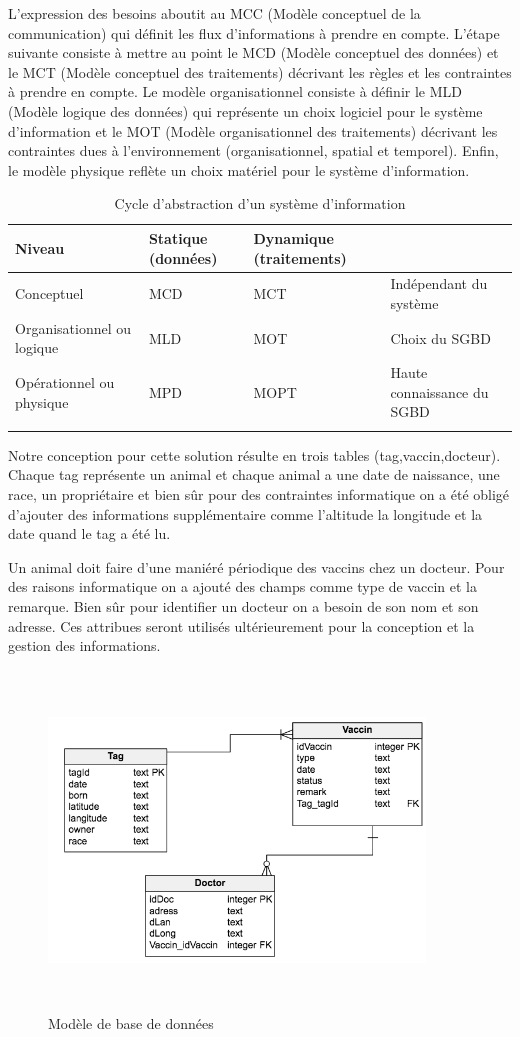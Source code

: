 \documentclass[11pt, a4paper, twoside]{book}
\begin{document}
L'expression des besoins aboutit au MCC (Modèle conceptuel de la communication) qui définit les flux d'informations à prendre en compte.
L'étape suivante consiste à mettre au point le MCD (Modèle conceptuel des données) et le MCT (Modèle conceptuel des traitements) décrivant les règles et les contraintes à prendre en compte.
Le modèle organisationnel consiste à définir le MLD (Modèle logique des données) qui représente un choix logiciel pour le système d'information et le MOT (Modèle organisationnel des traitements) décrivant les contraintes dues à l'environnement (organisationnel, spatial et temporel).
Enfin, le modèle physique reflète un choix matériel pour le système d'information. 


\begin{longtable}{|p{}|p{}|p{}| p{}|}
\hline
\textbf{Niveau } & \textbf{Statique (données) } & \textbf{Dynamique (traitements) } & \\
\hline
Conceptuel  & MCD & MCT  & Indépendant du système \\
\hline
Organisationnel ou logique  & MLD & MOT & Choix du SGBD
 \\
\hline
Opérationnel
ou physique  & MPD  & MOPT  & Haute connaissance du
SGBD \\
\hline
\caption{Cycle d'abstraction d'un système d'information}
\end{longtable}

Notre conception pour cette solution résulte en trois tables (tag,vaccin,docteur). Chaque tag représente un animal et chaque animal a une date de naissance, une race, un propriétaire et bien sûr pour des contraintes informatique on a été obligé d'ajouter des informations supplémentaire comme l'altitude la longitude et la date quand le tag a été lu.

Un animal doit faire d'une maniéré périodique des vaccins chez un docteur. Pour des raisons informatique on a ajouté des champs comme type de vaccin et la remarque. Bien sûr pour identifier un docteur on a besoin de son nom et son adresse. Ces attribues seront utilisés ultérieurement pour la conception et la gestion des informations.

\begin{figure}[!h]
\centering
\includegraphics[width=10cm,height=9cm]{ddb}
\caption{Modèle de base de données}
\end{figure}
\end{document}
